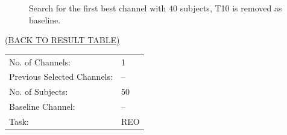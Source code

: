 \documentclass[oneside, a4paper,10pt]{report}
\begin{document}
\begin{figure}[H]
  \caption{Search for the first best channel with $40$ subjects, T10 is removed as baseline.}
  \label{fg:1Ch_S40_B1}
\end{figure}



\newpage

\hspace*{12cm}\hyperlink{tab:TestResults}{(BACK TO RESULT TABLE)}

\bigskip
\bigskip

\begin{tabular}{ll}
  No. of Channels: & 1\\
  Previous Selected Channels: & --\\
  No. of Subjects: & 50\\
  Baseline Channel: & --\\
  Task:	& REO 
\end{tabular}
\end{document}
